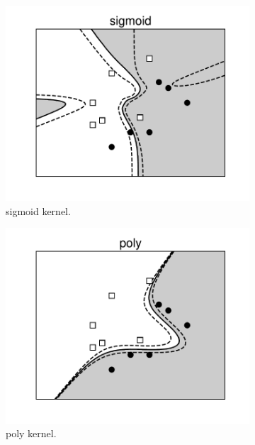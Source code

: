 \begin{figure}[t]
\begin{subfigure}{0.325\textwidth}
\includegraphics[width=\linewidth]{Chapters/09_SupportVectorMachines/21_kernelsvm/plt/sigmoid3.pdf}
\caption{sigmoid kernel.}
\end{subfigure}
\begin{subfigure}{0.325\textwidth}
\includegraphics[width=\linewidth]{Chapters/09_SupportVectorMachines/21_kernelsvm/plt/poly3.pdf}
\caption{poly kernel.}
\end{subfigure}
\begin{subfigure}{0.325\textwidth}

\end{subfigure}
\end{figure}
